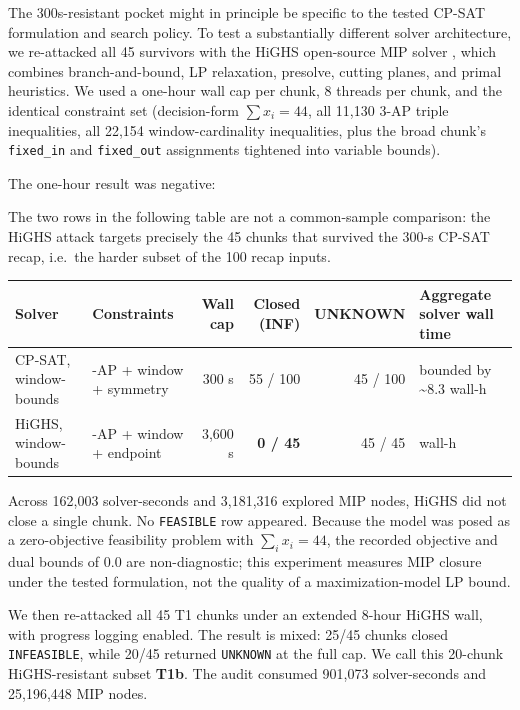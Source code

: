 The 300s-resistant pocket might in principle be specific to the tested
CP-SAT formulation and search policy. To test a substantially different
solver architecture, we re-attacked all 45 survivors with
the HiGHS open-source MIP solver \cite{huangfu-hall-2018-highs}, which combines branch-and-bound, LP
relaxation, presolve, cutting planes, and primal heuristics. We used a
one-hour wall cap per chunk, 8 threads per chunk, and the identical
constraint set
(decision-form $\sum x_i = 44$, all 11,130 3-AP triple inequalities, all
22,154 window-cardinality inequalities, plus the broad chunk's \texttt{fixed\_in}
and \texttt{fixed\_out} assignments tightened into variable bounds).

The one-hour result was negative:

The two rows in the following table are not a common-sample comparison: the
HiGHS attack targets precisely the 45 chunks that survived the 300-s
CP-SAT recap, i.e.~the harder subset of the 100 recap inputs.

{\def\LTcaptype{none} %
\begin{longtable}[]{@{}
  >{\raggedright\arraybackslash}p{}
  >{\raggedright\arraybackslash}p{}
  rrr
  >{\raggedright\arraybackslash}p{}@{}}
\toprule\noalign{}
Solver & Constraints & Wall cap & Closed (INF) & UNKNOWN & Aggregate solver wall time \\
\midrule\noalign{}
\endhead
\bottomrule\noalign{}
\endlastfoot
CP-SAT, window-bounds & 3-AP + window + symmetry & 300 s & 55 / 100 & 45 / 100 & bounded by \textasciitilde8.3 wall-h \\
HiGHS, window-bounds & 3-AP + window + endpoint & 3,600 s & \textbf{0 / 45} & 45 / 45 & 45.0 wall-h \\
\end{longtable}
}

Across 162,003 solver-seconds and 3,181,316 explored MIP nodes, HiGHS did
not close a single chunk. No \texttt{FEASIBLE} row appeared. Because the model
was posed as a zero-objective feasibility problem with $\sum_i x_i=44$, the
recorded objective and dual bounds of $0.0$ are non-diagnostic; this experiment
measures MIP closure under the tested formulation, not the quality of a
maximization-model LP bound.

We then re-attacked all 45 T1 chunks under an extended 8-hour HiGHS wall,
with progress logging enabled. The result is mixed: 25/45 chunks closed
\texttt{INFEASIBLE}, while 20/45 returned \texttt{UNKNOWN} at the full cap. We call
this 20-chunk HiGHS-resistant subset \textbf{T1b}. The audit consumed
901,073 solver-seconds and 25,196,448
MIP nodes.

